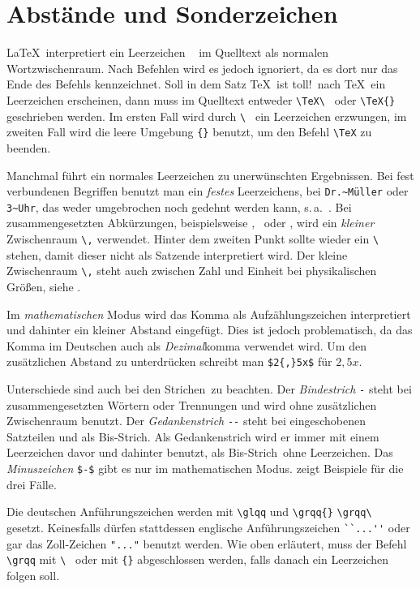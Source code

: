 \section{Abstände und Sonderzeichen}
\label{sec:Sonderzeichen}
\LaTeX\ interpretiert ein Leerzeichen \verb*| | im Quelltext als normalen Wortzwischenraum.
Nach Befehlen wird es jedoch ignoriert, da es dort nur das Ende des Befehls kennzeichnet.
Soll \zB in dem Satz \glqq\TeX\ ist toll!\grqq\ nach \glqq\TeX\grqq\ ein Leerzeichen erscheinen, dann muss im Quelltext entweder \verb*|\TeX\ | oder \verb|\TeX{}| geschrieben werden.
Im ersten Fall wird durch \verb*|\ | ein Leerzeichen erzwungen, im zweiten Fall wird die leere Umgebung \verb|{}| benutzt, um den Befehl \verb|\TeX| zu beenden.

Manchmal führt ein normales Leerzeichen zu unerwünschten Ergebnissen.
Bei fest verbundenen Begriffen benutzt man ein \emph{festes} Leerzeichens, \zB bei \verb|Dr.~Müller| oder \verb|3~Uhr|, das weder umgebrochen noch gedehnt werden
kann, s.\,a.\ .
Bei zusammengesetzten Abkürzungen, beispielsweise \glqq\dah\grqq, \glqq\ua\grqq\ oder \glqq\zB\grqq, wird ein \emph{kleiner} Zwischenraum \verb|\,| verwendet.
Hinter dem zweiten Punkt sollte wieder ein \verb*|\ | stehen, damit dieser nicht als Satzende interpretiert wird.
Der kleine Zwischenraum \verb|\,| steht auch zwischen Zahl und Einheit bei physikalischen Größen, siehe .

Im \emph{mathematischen} Modus wird das Komma als Aufzählungszeichen interpretiert und dahinter ein kleiner Abstand eingefügt.
Dies ist jedoch problematisch, da das Komma im Deutschen auch als \emph{Dezimal}komma verwendet wird.
Um den zusätzlichen Abstand zu unterdrücken schreibt man \zB \verb|$2{,}5x$| für \glqq $2{,}5x$\grqq.

Unterschiede sind auch bei den \glqq Strichen\grqq\ zu beachten.
Der \emph{Bindestrich} \verb|-| steht bei zusammengesetzten Wörtern oder Trennungen und wird ohne zusätzlichen Zwischenraum benutzt.
Der \emph{Gedankenstrich} \verb|--| steht bei eingeschobenen Satzteilen und als \glqq Bis-Strich\grqq.
Als Gedankenstrich wird er immer mit einem Leerzeichen davor und dahinter benutzt, als \glqq Bis-Strich\grqq\ ohne Leerzeichen.
Das \emph{Minuszeichen} \verb|$-$| gibt es nur im mathematischen Modus.
 zeigt Beispiele für die drei Fälle.

Die deutschen Anführungszeichen werden mit \verb|\glqq| und \verb|\grqq{}| \bzw \verb*|\grqq\ | gesetzt.
Keinesfalls dürfen stattdessen englische Anführungszeichen \verb|``...''| oder gar das Zoll-Zeichen \verb|"..."| benutzt werden.
Wie oben erläutert, muss der Befehl \verb|\grqq| mit \verb*|\ | oder mit \verb|{}| abgeschlossen werden, falls danach ein Leerzeichen folgen soll.

